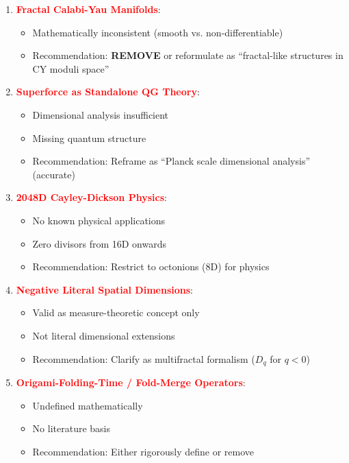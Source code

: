 \begin{enumerate}
    \item \textcolor{red}{\textbf{Fractal Calabi-Yau Manifolds}}:
    \begin{itemize}
        \item Mathematically inconsistent (smooth vs. non-differentiable)
        \item Recommendation: \textbf{REMOVE} or reformulate as ``fractal-like structures in CY moduli space''
    \end{itemize}

    \item \textcolor{red}{\textbf{Superforce as Standalone QG Theory}}:
    \begin{itemize}
        \item Dimensional analysis insufficient
        \item Missing quantum structure
        \item Recommendation: Reframe as ``Planck scale dimensional analysis'' (accurate)
    \end{itemize}

    \item \textcolor{red}{\textbf{2048D Cayley-Dickson Physics}}:
    \begin{itemize}
        \item No known physical applications
        \item Zero divisors from 16D onwards
        \item Recommendation: Restrict to octonions (8D) for physics
    \end{itemize}

    \item \textcolor{red}{\textbf{Negative Literal Spatial Dimensions}}:
    \begin{itemize}
        \item Valid as measure-theoretic concept only
        \item Not literal dimensional extensions
        \item Recommendation: Clarify as multifractal formalism ($D_q$ for $q < 0$)
    \end{itemize}

    \item \textcolor{red}{\textbf{Origami-Folding-Time / Fold-Merge Operators}}:
    \begin{itemize}
        \item Undefined mathematically
        \item No literature basis
        \item Recommendation: Either rigorously define or remove
    \end{itemize}
\end{enumerate}

